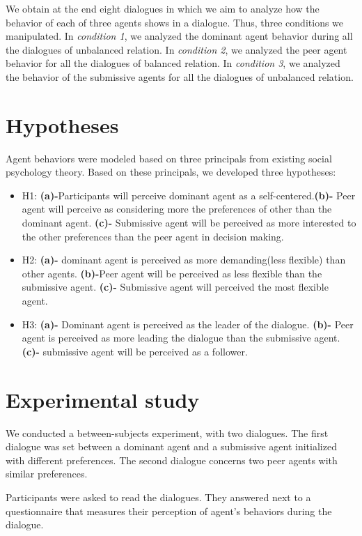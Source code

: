 \documentclass{llncs}
\begin{document}
We obtain at the end eight dialogues in which we aim to analyze how the behavior of each of three agents shows in a dialogue. Thus, three conditions we manipulated.
In \emph{condition 1}, we analyzed the dominant agent behavior during all the dialogues of unbalanced relation. In \emph{condition 2}, we analyzed the peer agent behavior for all the dialogues of balanced relation. In \emph{condition 3}, we analyzed the behavior of the submissive agents for all the dialogues of unbalanced relation.

\section{Hypotheses}
Agent behaviors were modeled based on three principals from existing social psychology theory. Based on these principals, we developed three hypotheses:

\begin{itemize}
	\item H1: \textbf{(a)-}Participants will perceive dominant agent as a self-centered.\textbf{(b)-} Peer agent will perceive as considering more the preferences of other than the dominant agent. \textbf{(c)-} Submissive agent will be perceived as more interested to the other preferences than the peer agent in decision making.
	\item H2: \textbf{(a)-} dominant agent is perceived as more demanding(less flexible) than other agents. \textbf{(b)-}Peer agent will be perceived as less flexible than the submissive agent. \textbf{(c)-} Submissive agent will perceived the most flexible agent.
	
	\item H3: \textbf{(a)-} Dominant agent is perceived as the leader of the dialogue. \textbf{(b)-} Peer agent is perceived as more leading the dialogue than the submissive agent. \textbf{(c)-} submissive agent  will be perceived as a follower.
	
\end{itemize}

\section{Experimental study}
We conducted a between-subjects experiment, with two dialogues. The first dialogue was set between a dominant agent and a submissive agent initialized with different preferences. The second dialogue concerns two peer agents with similar preferences. 


Participants were asked to read the dialogues. They answered next to a questionnaire that measures their perception of agent’s behaviors during the dialogue. 
\end{document}
